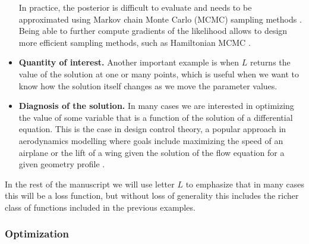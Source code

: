 \begin{itemize}
    In practice, the posterior is difficult to evaluate and needs to be approximated using Markov chain Monte Carlo (MCMC) sampling methods \cite{gelman2013bayesian}. Being able to further compute gradients of the likelihood allows to design more efficient sampling methods, such as Hamiltonian MCMC \cite{Betancourt_2017}.
    \item \textbf{Quantity of interest.} Another important example is when $L$ returns the value of the solution at one or many points, which is useful when we want to know how the solution itself changes as we move the parameter values. 
    \item \textbf{Diagnosis of the solution.} In many cases we are interested in optimizing the value of some variable that is a function of the solution of a differential equation. This is the case in design control theory, a popular approach in aerodynamics modelling where goals include maximizing the speed of an airplane or the lift of a wing given the solution of the flow equation for a given geometry profile \cite{Jameson_1988,Giles:2000wp,Mohammadi:2004dg}. 
\end{itemize}
In the rest of the manuscript we will use letter $L$ to emphasize that in many cases this will be a loss function, but without loss of generality this includes the richer class of functions included in the previous examples. 

\subsubsection{Optimization}

